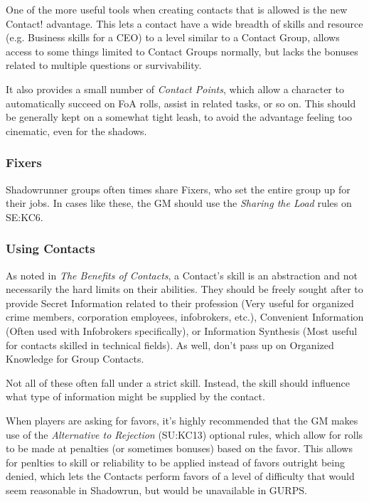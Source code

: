 \begin{multicols*}{2}
	One of the more useful tools when creating contacts that is allowed is the new Contact! advantage. This lets a contact have a wide breadth of skills and resource (e.g. Business skills for a CEO) to a level similar to a Contact Group, allows access to some things limited to Contact Groups normally, but lacks the bonuses related to multiple questions or survivability. 
	
	It also provides a small number of \textit{Contact Points}, which allow a character to automatically succeed on FoA rolls, assist in related tasks, or so on. This should be generally kept on a somewhat tight leash, to avoid the advantage feeling too cinematic, even for the shadows.
	
	\subsubsection{Fixers}
	
	Shadowrunner groups often times share Fixers, who set the entire group up for their jobs. In cases like these, the GM should use the \textit{Sharing the Load} rules on SE:KC6.
	
	\subsubsection{Using Contacts}
	
	As noted in \textit{The Benefits of Contacts}, a Contact's skill is an abstraction and not necessarily the hard limits on their abilities. They should be freely sought after to provide Secret Information related to their profession (Very useful for organized crime members, corporation employees, infobrokers, etc.), Convenient Information (Often used with Infobrokers specifically), or Information Synthesis (Most useful for contacts skilled in technical fields). As well, don't pass up on Organized Knowledge for Group Contacts.
	
	Not all of these often fall under a strict skill. Instead, the skill should influence what type of information might be supplied by the contact.
	
	When players are asking for favors, it's highly recommended that the GM makes use of the \textit{Alternative to Rejection} (SU:KC13) optional rules, which allow for rolls to be made at penalties (or sometimes bonuses) based on the favor. This allows for penlties to skill or reliability to be applied instead of favors outright being denied, which lets the Contacts perform favors of a level of difficulty that would seem reasonable in Shadowrun, but would be unavailable in GURPS.
	

\end{multicols*}
